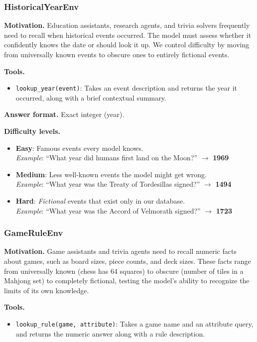 \subsubsection{HistoricalYearEnv}

\textbf{Motivation.}
Education assistants, research agents, and trivia solvers frequently need to recall when historical events occurred. The model must assess whether it confidently knows the date or should look it up. We control difficulty by moving from universally known events to obscure ones to entirely fictional events.

\textbf{Tools.}
\begin{itemize}
    \item \texttt{lookup\_year(event)}: Takes an event description and returns the year it occurred, along with a brief contextual summary.
\end{itemize}

\textbf{Answer format.} Exact integer (year).

\textbf{Difficulty levels.}
\begin{itemize}
    \item \textbf{Easy}: Famous events every model knows.\\
    \emph{Example}: ``What year did humans first land on the Moon?'' $\to$ \textbf{1969}
    \item \textbf{Medium}: Less well-known events the model might get wrong.\\
    \emph{Example}: ``What year was the Treaty of Tordesillas signed?'' $\to$ \textbf{1494}
    \item \textbf{Hard}: \emph{Fictional} events that exist only in our database.\\
    \emph{Example}: ``What year was the Accord of Velmorath signed?'' $\to$ \textbf{1723}
\end{itemize}

\subsubsection{GameRuleEnv}

\textbf{Motivation.}
Game assistants and trivia agents need to recall numeric facts about games, such as board sizes, piece counts, and deck sizes. These facts range from universally known (chess has 64 squares) to obscure (number of tiles in a Mahjong set) to completely fictional, testing the model's ability to recognize the limits of its own knowledge.

\textbf{Tools.}
\begin{itemize}
    \item \texttt{lookup\_rule(game, attribute)}: Takes a game name and an attribute query, and returns the numeric answer along with a rule description.
\end{itemize}

